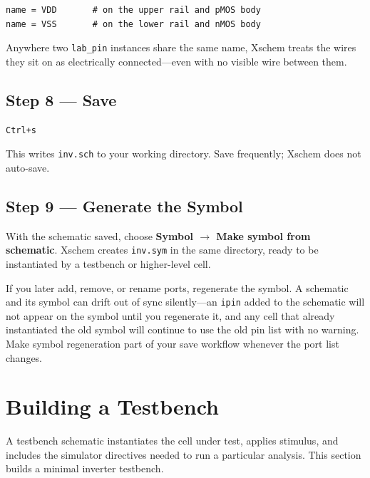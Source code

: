 \documentclass[11pt]{article}
\begin{document}
\begin{lstlisting}
name = VDD       # on the upper rail and pMOS body
name = VSS       # on the lower rail and nMOS body
\end{lstlisting}

Anywhere two \texttt{lab\_pin} instances share the same name, Xschem
treats the wires they sit on as electrically connected---even with no
visible wire between them.

\subsection{Step 8 --- Save}

\begin{lstlisting}
Ctrl+s
\end{lstlisting}

This writes \texttt{inv.sch} to your working directory.
Save frequently; Xschem does not auto-save.

\subsection{Step 9 --- Generate the Symbol}

With the schematic saved, choose \textbf{Symbol $\rightarrow$ Make
symbol from schematic}.
Xschem creates \texttt{inv.sym} in the same directory, ready to be
instantiated by a testbench or higher-level cell.

\begin{warnbox}
If you later add, remove, or rename ports, regenerate the symbol.
A schematic and its symbol can drift out of sync silently---an
\texttt{ipin} added to the schematic will not appear on the symbol
until you regenerate it, and any cell that already instantiated the old
symbol will continue to use the old pin list with no warning.
Make symbol regeneration part of your save workflow whenever the port
list changes.
\end{warnbox}

\section{Building a Testbench}

A testbench schematic instantiates the cell under test, applies stimulus,
and includes the simulator directives needed to run a particular
analysis.
This section builds a minimal inverter testbench.
\end{document}
